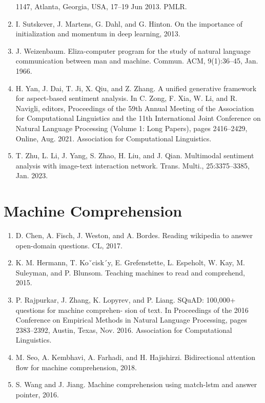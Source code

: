 \documentclass[]{article}
\begin{document}
\begin{enumerate}
1147, Atlanta, Georgia, USA, 17–19 Jun 2013. PMLR.
\item  I. Sutskever, J. Martens, G. Dahl, and G. Hinton. On the importance of initialization and momentum
in deep learning, 2013.
\item  J. Weizenbaum. Eliza-computer program for the study of natural language communication between
man and machine. Commun. ACM, 9(1):36–45, Jan. 1966.
\item  H. Yan, J. Dai, T. Ji, X. Qiu, and Z. Zhang. A unified generative framework for aspect-based sentiment
analysis. In C. Zong, F. Xia, W. Li, and R. Navigli, editors, Proceedings of the 59th Annual Meeting of
the Association for Computational Linguistics and the 11th International Joint Conference on Natural
Language Processing (Volume 1: Long Papers), pages 2416–2429, Online, Aug. 2021. Association for
Computational Linguistics.
\item  T. Zhu, L. Li, J. Yang, S. Zhao, H. Liu, and J. Qian. Multimodal sentiment analysis with image-text
interaction network. Trans. Multi., 25:3375–3385, Jan. 2023.
\end{enumerate}
\section{Machine Comprehension}
\begin{enumerate}
\item D. Chen, A. Fisch, J. Weston, and A. Bordes. Reading wikipedia to answer open-domain questions. CL,
2017.
\item K. M. Hermann, T. Koˇcisk´y, E. Grefenstette, L. Espeholt, W. Kay, M. Suleyman, and P. Blunsom.
Teaching machines to read and comprehend, 2015.
\item P. Rajpurkar, J. Zhang, K. Lopyrev, and P. Liang. SQuAD: 100,000+ questions for machine comprehen-
sion of text. In Proceedings of the 2016 Conference on Empirical Methods in Natural Language Processing,
pages 2383–2392, Austin, Texas, Nov. 2016. Association for Computational Linguistics.
\item M. Seo, A. Kembhavi, A. Farhadi, and H. Hajishirzi. Bidirectional attention flow for machine comprehension, 2018.
\item S. Wang and J. Jiang. Machine comprehension using match-lstm and answer pointer, 2016.
\end{enumerate}
\end{document}
